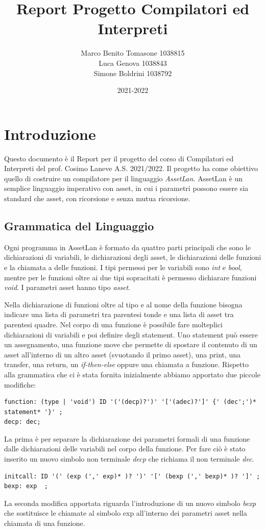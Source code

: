 \documentclass[12pt, a4paper]{report}
\title{Report Progetto Compilatori ed Interpreti}
\author{Marco Benito Tomasone 1038815\\
Luca Genova 1038843\\
Simone  Boldrini 1038792}
\date{2021-2022}
\begin{document}
    \maketitle
    \tableofcontents
    \chapter{Introduzione}
    Questo documento è il Report per il progetto del corso di  Compilatori ed Interpreti del prof. Cosimo Laneve A.S. 2021/2022. Il progetto ha come obiettivo quello di costruire un compilatore per il linguaggio \emph{AssetLan}.
    AssetLan è un semplice linguaggio imperativo con asset, in cui i parametri possono  essere sia standard che asset, con ricorsione e senza mutua ricorsione. 
    \section{Grammatica del Linguaggio}
    Ogni programma in AssetLan è formato da quattro parti principali che sono le dichiarazioni di variabili, le dichiarazioni degli asset, le dichiarazioni delle funzioni e la chiamata a delle funzioni. I tipi permessi per le variabili sono  \emph{int} e \emph{bool}, mentre per le funzioni oltre ai due tipi sopracitati è permesso dichiarare funzioni \emph{void}. I parametri asset hanno tipo \emph{asset}. 

    Nella dichiarazione di funzioni oltre al tipo e al nome della funzione bisogna indicare una lista di parametri tra parentesi tonde e una lista di asset tra parentesi quadre. Nel corpo di una funzione è possibile fare molteplici dichiarazioni di variabili e poi definire degli statement. 
    Uno statement può essere un assegnamento, una funzione move che permette di spostare il contenuto di un asset all'interno di un altro asset (svuotando il primo asset), una print, una transfer, una return, un \emph{if-then-else} oppure una chiamata a funzione. 
    Rispetto alla grammatica che ci è stata fornita inizialmente abbiamo apportato due piccole modifiche: 
    \begin{lstlisting}      
function: (type | 'void') ID '('(decp)?')' '['(adec)?']' {' (dec';')* statement* '}' ;
decp: dec;
    \end{lstlisting}  
    La prima è per separare la dichiarazione dei parametri formali di una funzione dalle dichiarazioni delle variabili nel corpo della funzione. Per fare ciò è stato inserito un nuovo simbolo non terminale \emph{decp} che richiama il non terminale \emph{dec}.
    \begin{lstlisting}      
initcall: ID '(' (exp (',' exp)* )? ')' '[' (bexp (',' bexp)* )? ']' ;
bexp: exp  ;
    \end{lstlisting}
La seconda modifica apportata riguarda l'introduzione di un nuovo simbolo \emph{bexp} che sostituisce le chiamate al simbolo exp all'interno dei parametri asset nella chiamata di una funzione. 
\end{document}
